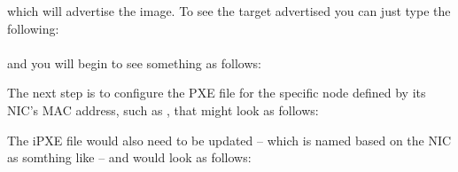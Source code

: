 \noindent which will advertise the image.  To see the target advertised you can just type the following: \\

 \\

\noindent and you will begin to see something as follows: \\


The next step is to configure the PXE file for the specific node defined by its NIC's MAC address, such as , that might look as follows: \\


The iPXE file would also need to be updated -- which is named based on the NIC as somthing like  -- and would look as follows: \\

